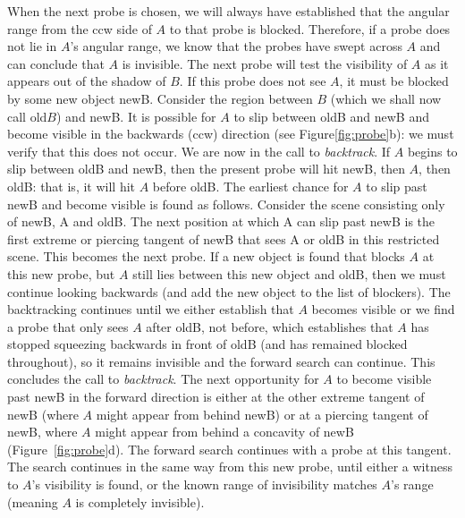 \documentclass[10pt,twocolumn]{article}
\begin{document}
When the next probe is chosen,
we will always have established that the angular range from the ccw side of $A$
to that probe is blocked.
Therefore, if a probe does not lie in $A$'s angular range, we know that
the probes have swept across $A$ and can conclude that $A$ is invisible.
The next probe will test the visibility of $A$ as it appears out of the shadow of $B$.
If this probe does not see $A$, it must be blocked by some new object newB.
Consider the region between $B$ (which we shall now call old$B$) and newB.
It is possible for $A$ to slip between oldB and newB and become visible in the 
backwards (ccw) direction (see Figure\ref{fig:probe}b): %
we must verify that this does not occur.
We are now in the call to {\em backtrack}.
If $A$ begins to slip between oldB and newB, then the present probe will hit newB,
then $A$, then oldB: that is, it will hit $A$ before oldB.
The earliest chance for $A$ to slip past newB and become visible is found as follows.
Consider the scene consisting only of newB, A and oldB.
The next position at which A can slip past newB is the first extreme or piercing
tangent of newB that sees A or oldB in this restricted scene.
This becomes the next probe.
If a new object is found that blocks $A$ at this new probe, but $A$ still lies between
this new object and oldB, then we must continue looking backwards (and add the new
object to the list of blockers).
The backtracking continues until we either establish that $A$ becomes visible
or we find a probe that only sees $A$ after oldB, not before, which establishes
that $A$ has stopped squeezing backwards in front of oldB (and has remained blocked
throughout), so it remains invisible and the forward search can continue.
This concludes the call to {\em backtrack}.
The next opportunity for $A$ to become visible past newB in the forward direction
is either at the other extreme tangent of newB %
(where $A$ might appear from behind newB)
or at a piercing tangent of newB,
where $A$ might appear from behind a concavity of newB 
(Figure~\ref{fig:probe}d). %
The forward search continues with a probe at this tangent.
The search continues in the same way from this new probe, until 
either a witness to $A$'s visibility is found, or the known range
of invisibility matches $A$'s range (meaning $A$ is completely invisible).
\end{document}
